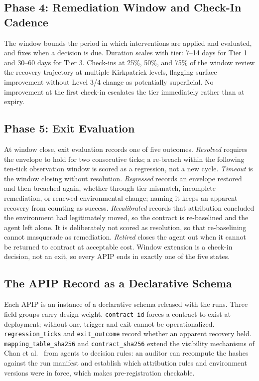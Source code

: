 \documentclass[conference]{IEEEtran}
\begin{document}
\subsection{Phase 4: Remediation Window and Check-In Cadence}

The window bounds the period in which interventions are applied and evaluated, and fixes when a decision is due. Duration scales with tier: 7--14 days for Tier 1 and 30--60 days for Tier 3. Check-ins at 25\%, 50\%, and 75\% of the window review the recovery trajectory at multiple Kirkpatrick levels, flagging surface improvement without Level 3/4 change as potentially superficial. No improvement at the first check-in escalates the tier immediately rather than at expiry.

\subsection{Phase 5: Exit Evaluation}

At window close, exit evaluation records one of five outcomes. \emph{Resolved} requires the envelope to hold for two consecutive ticks; a re-breach within the following ten-tick observation window is scored as a regression, not a new cycle. \emph{Timeout} is the window closing without resolution. \emph{Regressed} records an envelope restored and then breached again, whether through tier mismatch, incomplete remediation, or renewed environmental change; naming it keeps an apparent recovery from counting as success. \emph{Recalibrated} records that attribution concluded the environment had legitimately moved, so the contract is re-baselined and the agent left alone. It is deliberately not scored as resolution, so that re-baselining cannot masquerade as remediation. \emph{Retired} closes the agent out when it cannot be returned to contract at acceptable cost. Window extension is a check-in decision, not an exit, so every APIP ends in exactly one of the five states.

\subsection{The APIP Record as a Declarative Schema}

Each APIP is an instance of a declarative schema released with the runs. Three field groups carry design weight. \texttt{contract\_id} forces a contract to exist at deployment; without one, trigger and exit cannot be operationalized. \texttt{regression\_ticks} and \texttt{exit\_outcome} record whether an apparent recovery held. \texttt{mapping\_table\_sha256} and \texttt{contract\_sha256} extend the visibility mechanisms of Chan et al.~\cite{ref14} from agents to decision rules: an auditor can recompute the hashes against the run manifest and establish which attribution rules and environment versions were in force, which makes pre-registration checkable.
\end{document}
